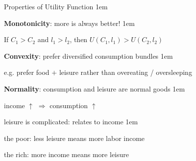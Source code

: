 \documentclass[11pt,aspectratio=43]{beamer}
\let\olditemize=\itemize
\let\endolditemize=\enditemize
\renewenvironment{itemize}{\olditemize \itemsep1em}{\endolditemize}
\let\oldenumerate=\enumerate
\let\endoldenumerate=\endenumerate
\renewenvironment{enumerate}{\oldenumerate \itemsep1em}{ \endoldenumerate}
\theoremstyle{definition}
\begin{document}
\begin{frame}{Properties of Utility Function}
\label{slide:Properties_of_Utility_Function}
    \begin{enumerate}
        \item \textbf{Monotonicity}: more is always better!
        \begin{itemize}
            \item If $ C_{1} > C_{2} $ and $ l_{1} > l_{2} $, then $ U( C_{1}, l_{1} ) > U( C_{2}, l_{2} ) $
        \end{itemize}
        \item \textbf{Convexity}: prefer \alert{diversified} consumption bundles
        \begin{itemize}
            \item e.g. prefer food $ + $ leisure rather than overeating / oversleeping
        \end{itemize}
        \item \textbf{Normality}: consumption and leisure are \alert{normal} goods
        \begin{itemize}
            \item income $ \uparrow  $ $ \Rightarrow  $ consumption $ \uparrow  $
            \item leisure is complicated: relates to income
            \begin{itemize}
                \item the poor: less leisure means \alert{more} labor income
                \item the rich: more income means \alert{more} leisure
            \end{itemize}
        \end{itemize}
    \end{enumerate}
\end{frame}
\end{document}
